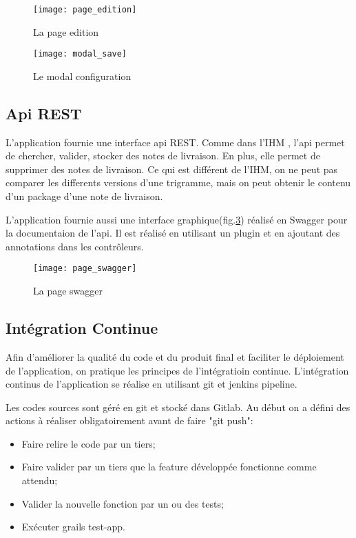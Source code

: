 \begin{figure}[ht]
 \centering
 \texttt{[image: page\_edition]}
 \caption{La page edition}
 \label{fig:page_edition}
\end{figure}

\begin{figure}[ht]
 \centering
 \texttt{[image: modal\_save]}
 \caption{Le modal configuration}
 \label{fig:modal_save}
\end{figure}

\subsection{Api REST}
L'application fournie une interface api REST.
Comme dans l'IHM , l'api permet de chercher, valider, stocker des notes de livraison.
En plus, elle permet de supprimer des notes de livraison.
Ce qui est différent de l'IHM, on ne peut pas comparer les differents versions d'une trigramme, mais on peut obtenir le contenu d'un package d'une note de livraison.

L'application fournie aussi une interface graphique(fig.\ref{fig:page_swagger}) réalisé en Swagger pour la documentaion de l'api.
Il est réalisé en utilisant un plugin et en ajoutant des annotations dans les contrôleurs.

\begin{figure}[ht]
 \centering
 \texttt{[image: page\_swagger]}
 \caption{La page swagger}
 \label{fig:page_swagger}
\end{figure}

\subsection{Intégration Continue}
Afin d'améliorer la qualité du code et du produit final et faciliter le déploiement de l'application, on pratique les principes de l'intégratioin continue.
L'intégration continus de l'application se réalise en utilisant git et jenkins pipeline.

Les codes sources sont géré en git et stocké dans Gitlab.
Au début on a défini des actions à réaliser obligatoirement avant de faire "git push":
\begin{itemize}
 \item Faire relire le code par un tiers;
 \item Faire valider par un tiers que la feature développée fonctionne comme attendu;
 \item Valider la nouvelle fonction par un ou des tests;
 \item Exécuter grails test-app.
\end{itemize}

